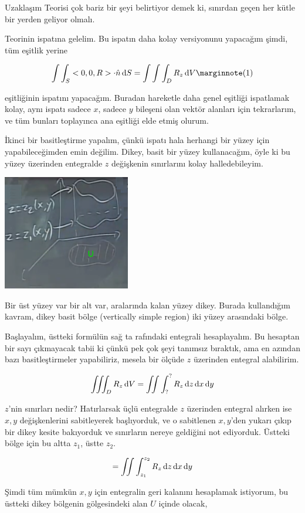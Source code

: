 \documentclass[12pt,fleqn]{article}\usepackage{../../common}
\begin{document}
Uzaklaşım Teorisi çok bariz bir şeyi belirtiyor demek ki, sınırdan geçen
her kütle bir yerden geliyor olmalı.

Teorinin ispatına gelelim. Bu ispatın daha kolay versiyonunu yapacağım şimdi,
tüm eşitlik yerine

$$
\int \int_S < 0,0,R > \cdot \hat{n} \ud S =
\int \int \int_D R_z \ud V
\mlabel{1}
$$

eşitliğinin ispatını yapacağım. Buradan hareketle daha genel eşitliği
ispatlamak kolay, aynı ispatı sadece $x$, sadece $y$ bileşeni olan
vektör alanları için tekrarlarım, ve tüm bunları toplayınca ana eşitliği
elde etmiş olurum.

İkinci bir basitleştirme yapalım, çünkü ispatı hala herhangi bir yüzey için
yapabileceğimden emin değilim. Dikey, basit bir yüzey kullanacağım, öyle ki
bu yüzey üzerinden entegralde $z$ değişkenin sınırlarını kolay halledebileyim.

\includegraphics[width=15em]{calc_multi_29_01.png}

Bir üst yüzey var bir alt var, aralarında kalan yüzey dikey. Burada kullandığım
kavram, dikey basit bölge (vertically simple region) iki yüzey arasındaki bölge.

Başlayalım, üstteki formülün sağ ta rafındaki entegrali hesaplayalım. Bu
hesaptan bir sayı çıkmayacak tabii ki çünkü pek çok şeyi tanımsız bıraktık, ama
en azından bazı basitleştirmeler yapabiliriz, mesela bir ölçüde $z$ üzerinden
entegral alabilirim. 

$$
\iiint_D R_z \,\mathrm{d} V = \iint \int_?^? R_z \,\mathrm{d} z \,\mathrm{d} x \,\mathrm{d} y
$$

$z$'nin sınırları nedir? Hatırlarsak üçlü entegralde $z$ üzerinden entegral
alırken ise $x,y$ değişkenlerini sabitleyerek başlıyorduk, ve o sabitlenen
$x,y$'den yukarı çıkıp bir dikey kesite bakıyorduk ve sınırların nereye
geldiğini not ediyorduk. Üstteki bölge için bu altta $z_1$, üstte $z_2$. 

$$
= \iint \int_{z_1}^{z_2} R_z \,\mathrm{d} z \,\mathrm{d} x \,\mathrm{d} y
$$

Şimdi tüm mümkün $x,y$ için entegralin geri kalanını hesaplamak istiyorum,
bu üstteki dikey bölgenin gölgesindeki alan $U$ içinde olacak, 
\end{document}
